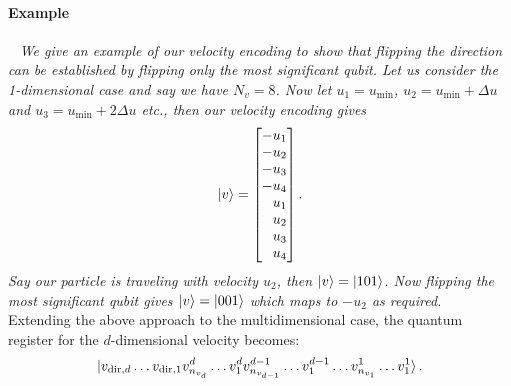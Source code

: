 \paragraph{Example}\
\normalem
\emph{We give an example of our velocity encoding to show that flipping the direction can be established by flipping only the most significant qubit. Let us consider the 1-dimensional case and say we have $N_v = 8$. Now let $u_1 = u_{\min}$, $u_2 = u_{\min} + \Delta u$ and $u_3 = u_{\min} + 2\Delta u$ etc., then our velocity encoding gives $$\ket{v} = \begin{bmatrix}
-u_1 \\ -u_2\\ -u_3 \\ -u_4\\ \phantom{-}u_1 \\ \phantom{-}u_2\\ \phantom{-}u_3 \\ \phantom{-}u_4 
\end{bmatrix}.$$ Say our particle is traveling with velocity $u_2$, then $\ket{v} = \ket{101}$. Now flipping the most significant qubit gives $\ket{v} = \ket{001}$ which maps to $-u_2$ as required. }\\

\ULforem
Extending the above approach to the multidimensional case, the quantum register for the $d$-dimensional velocity becomes: 
\begin{equation}
\ket{v_{\text{dir},d} \dots v_{\text{dir},1} v^d_{n_{v_d}} \dots v^d_{1} v^{d-1}_{n_{v_{d-1}}} \dots v^{d-1}_{1} \dots v^1_{n_{v_1}} \dots v^1_{1}} . 
\end{equation}

